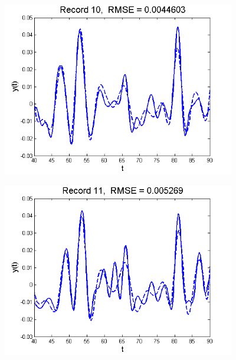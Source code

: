 \documentclass[11pt]{beamer}
\begin{document}
\begin{frame}

\begin{center}
\includegraphics[width=4in]{figs/SelTIC_fit10.png}
\end{center}

\end{frame}


\begin{frame}

\begin{center}
\includegraphics[width=4in]{figs/SelTIC_fit11.png}
\end{center}

\end{frame}

\end{document}
